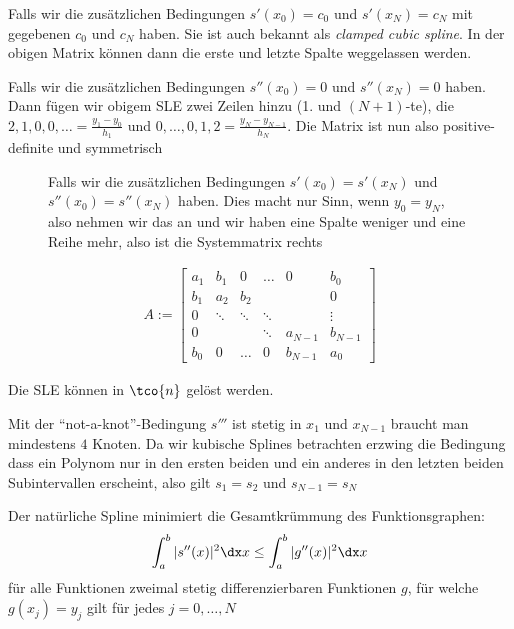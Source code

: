  Falls wir die zusätzlichen Bedingungen $s'(x_0) = c_0$ und $s'(x_N) = c_N$ mit gegebenen $c_0$ und $c_N$ haben.
Sie ist auch bekannt als \textit{clamped cubic spline}.
In der obigen Matrix können dann die erste und letzte Spalte weggelassen werden.

 Falls wir die zusätzlichen Bedingungen $s''(x_0) = 0$ und $s''(x_N) = 0$ haben.
Dann fügen wir obigem SLE zwei Zeilen hinzu (1. und $(N + 1)$-te), die $2, 1, 0, 0, \ldots = \frac{y_1 - y_0}{h_1}$ und $0, \ldots, 0, 1, 2 = \frac{y_N - y_{N - 1}}{h_N}$.
Die Matrix ist nun also positive-definite und symmetrisch

\vspace{-1.25pc}
{
    \begin{wrapfigure}[6]{l}{0.5\textwidth}
         Falls wir die zusätzlichen Bedingungen $s'(x_0) = s'(x_N)$ und $s''(x_0) = s''(x_N)$ haben.
        Dies macht nur Sinn, wenn $y_0 = y_N$, also nehmen wir das an und wir haben eine Spalte weniger und eine Reihe mehr, also ist die Systemmatrix rechts
    \end{wrapfigure}
    \begin{align*}
        A :=
        \begin{bmatrix}
            a_1 & b_1    & 0      & \dots  & 0         & b_0       \\
            b_1 & a_2    & b_2    &        &           & 0         \\
            0   & \ddots & \ddots & \ddots &           & \vdots    \\
            0   &        &        & \ddots & a_{N - 1} & b_{N - 1} \\
            b_0 & 0      & \dots  & 0      & b_{N - 1} & a_0
        \end{bmatrix}
    \end{align*}
}

\inlineremark Die SLE können in $\tco{n}$ gelöst werden.

\inlineremark Mit der ``not-a-knot''-Bedingung $s'''$ ist stetig in $x_1$ und $x_{N - 1}$ braucht man mindestens $4$ Knoten.
Da wir kubische Splines betrachten erzwing die Bedingung dass ein Polynom nur in den ersten beiden und ein anderes in den letzten beiden Subintervallen erscheint,
also gilt $s_1 = s_2$ und $s_{N - 1} = s_N$

\inlineremark Der natürliche Spline minimiert die Gesamtkrümmung des Funktionsgraphen:
\begin{align*}
    \int_{a}^{b} |s''(x)|^2 \dx x \leq \int_{a}^{b} |g''(x)|^2 \dx x
\end{align*}
für alle Funktionen zweimal stetig differenzierbaren Funktionen $g$, für welche $g(x_j) = y_j$ gilt für jedes $j = 0, \ldots, N$

